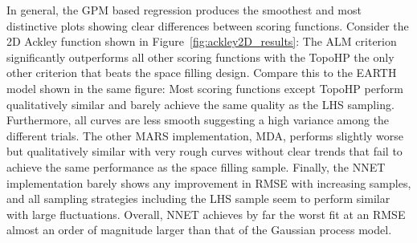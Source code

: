 In general, the GPM based regression produces the smoothest and most distinctive plots showing clear differences between scoring functions.
%
Consider the 2D Ackley function shown in Figure~\ref{fig:ackley2D_results}: The ALM criterion significantly outperforms all other scoring functions with the TopoHP the only other criterion that beats the space filling design.
%
Compare this to the EARTH model shown in the same figure: Most scoring functions except TopoHP perform qualitatively similar and barely achieve the same quality as the LHS sampling.
%
Furthermore, all curves are less smooth suggesting a high variance among the different trials.
%
The other MARS implementation, MDA, performs slightly worse but qualitatively similar with very rough curves without clear trends that fail to achieve the same performance as the space filling sample.
%
Finally, the NNET implementation barely shows any improvement in RMSE with increasing samples, and all sampling strategies including the LHS sample seem to perform similar with large fluctuations.
%
Overall, NNET achieves by far the worst fit at an RMSE almost an order of magnitude larger than that of the Gaussian process model.
